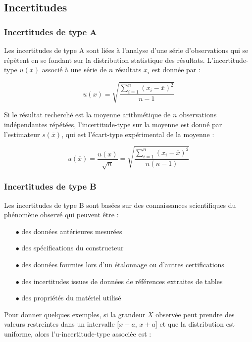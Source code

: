 \documentclass{article}
\begin{document}
\subsection{Incertitudes}

\subsubsection{Incertitudes de type A}

Les incertitudes de type A sont liées à l'analyse d'une série d'observations qui se répètent en se fondant sur la distribution statistique des résultats. L'incertitude-type $u(x)$ associé à une série de $n$ résultats $x_i$ est donnée par :

\begin{equation}
  u(x) = \sqrt{\dfrac{\sum\limits_{i=1}^n (x_i - \overline{x})^2}{n-1}}
\end{equation}

Si le résultat recherché est la moyenne arithmétique de $n$ observations indépendantes répétées, l'incertitude-type sur la moyenne est donné par l'estimateur $s(\overline{x})$, qui est l'écart-type expérimental de la moyenne :

\begin{equation}
  u(\overline{x}) = \dfrac{u(x)}{\sqrt{n}} = \sqrt{\dfrac{\sum\limits_{i=1}^n (x_i - \overline{x})^2}{n(n-1)}}
\end{equation}

\subsubsection{Incertitudes de type B}

Les incertitudes de type B sont basées sur des connaissances scientifiques du phénomène observé qui peuvent être :

\begin{itemize}
  \item[$\bullet$] des données antérieures mesurées
  \item[$\bullet$] des spécifications du constructeur
  \item[$\bullet$] des données fournies lors d'un étalonnage ou d'autres certifications
  \item[$\bullet$] des incertitudes issues de données de références extraites de tables
  \item[$\bullet$] des propriétés du matériel utilisé
\end{itemize}

Pour donner quelques exemples, si la grandeur $X$ observée peut prendre des valeurs restreintes dans un intervalle [$x - a$, $x + a$] et que la distribution est uniforme, alors l'u-incertitude-type associée est :
\end{document}
